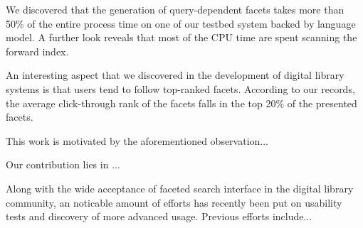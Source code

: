 

We discovered that the generation of query-dependent facets takes more than
50\% of the entire process time on one of our testbed system backed by language
model.  A further look reveals that most of the CPU time are spent scanning the
forward index. 

An interesting aspect that we discovered in the development of digital library
systems is that users tend to follow top-ranked facets.  According to our
records, the average click-through rank of the facets falls in the top 20\% of
the presented facets. 

This work is motivated by the aforementioned observation... 

Our contribution lies in ... 

Along with the wide acceptance of faceted search interface in the digital
library community, an noticable amount of efforts has recently been put on
usability tests and discovery of more advanced usage.  Previous efforts
include... 

